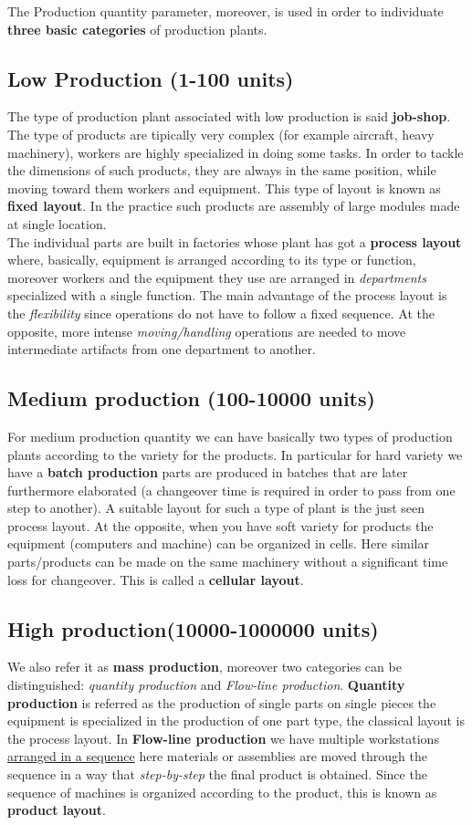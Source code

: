 The Production quantity parameter, moreover, is used in order to individuate \textbf{three basic categories} of production plants.

\subsection{Low Production (1-100 units)}
The type of production plant associated with low production is said \textbf{job-shop}. The type of products are tipically very complex (for example aircraft, heavy machinery), workers are highly specialized in doing some tasks. In order to tackle the dimensions of such products, they are always in the same position, while moving toward them workers and equipment. This type of layout is known as \textbf{fixed layout}. In the practice such products are assembly of large modules made at single location.\\
The individual parts are built in factories whose plant has got a \textbf{process layout} where, basically, equipment is arranged according to its type or function, moreover workers and the equipment they use are arranged in \textit{departments} specialized with a single function. The main advantage of the process layout is the \textit{flexibility} since operations do not have to follow a fixed sequence. At the opposite, more intense \textit{moving/handling} operations are needed to move intermediate artifacts from one department to another.
\subsection{Medium production (100-10000 units)}
For medium production quantity we can have basically two types of production plants according to the variety for the products. In particular for hard variety we have a \textbf{batch production} parts are produced in batches that are later furthermore elaborated (a changeover time is required in order to pass from one step to another). A suitable layout for such a type of plant is the just seen process layout. At the opposite, when you have soft variety for products the equipment (computers and machine) can be organized in cells. Here similar parts/products can be made on the same machinery without a significant time loss for changeover. This is called a \textbf{cellular layout}.

\subsection{High production(10000-1000000 units)}
We also refer it as \textbf{mass production}, moreover two categories can be distinguished: \textit{quantity production} and \textit{Flow-line production}. \textbf{Quantity production} is referred as the production of single parts on single pieces the equipment is specialized in the production of one part type, the classical layout is the process layout. In \textbf{Flow-line production} we have multiple workstations \underline{arranged in a sequence} here materials or assemblies are moved through the sequence in a way that \textit{step-by-step} the final product is obtained. Since the sequence of machines is organized according to the product, this is known as \textbf{product layout}.

